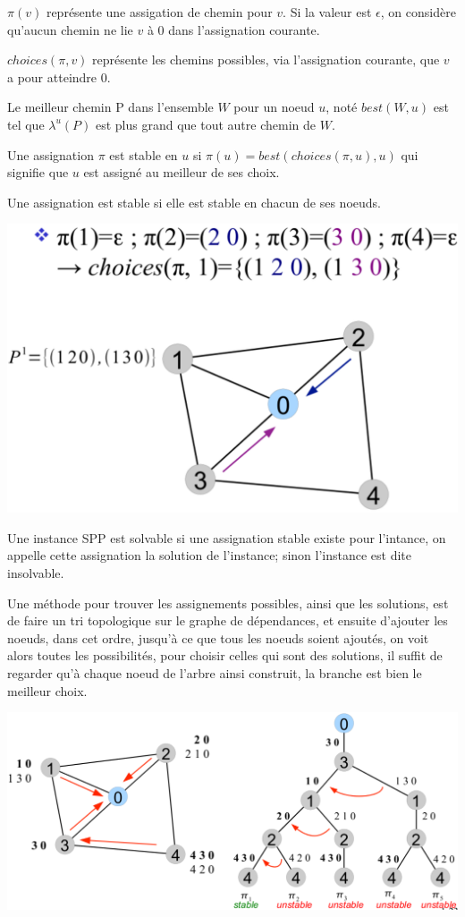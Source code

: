 \documentclass{article}
\begin{document}
\begin{sffamily}
$\pi(v)$ représente une assigation de chemin pour $v$. Si la valeur
est $\epsilon$, on considère qu'aucun chemin ne lie $v$ à $0$ dans
l'assignation courante.

$choices(\pi, v)$ représente les chemins possibles, via l'assignation
courante, que $v$ a pour atteindre $0$.

Le meilleur chemin P dans l'ensemble $W$ pour un noeud $u$, noté
$best(W, u)$ est tel que $\lambda^u(P)$ est plus grand que tout autre
chemin de $W$.

Une assignation $\pi$ est stable en $u$ si $\pi(u) = best(choices(\pi,
u), u)$ qui signifie que $u$ est assigné au meilleur de ses choix.

Une assignation est stable si elle est stable en chacun de ses noeuds.

\includegraphics[width=\textwidth]{fab_016.pdf}

Une instance SPP est solvable si une assignation stable existe pour
l'intance, on appelle cette assignation la solution de l'instance;
sinon l'instance est dite insolvable.

Une méthode pour trouver les assignements possibles, ainsi que les
solutions, est de faire un tri topologique sur le graphe de
dépendances, et ensuite d'ajouter les noeuds, dans cet ordre, jusqu'à
ce que tous les noeuds soient ajoutés, on voit alors toutes les
possibilités, pour choisir celles qui sont des solutions, il suffit de
regarder qu'à chaque noeud de l'arbre ainsi construit, la branche est
bien le meilleur choix.

\includegraphics[width=\textwidth]{fab_017.pdf}


\end{sffamily}
\end{document}
